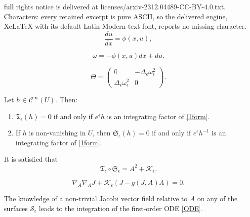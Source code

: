 \documentclass[10pt,a4paper]{amsart}
\begin{document}
full rights notice is delivered at licenses/arxiv-2312.04489-CC-BY-4.0.txt. Characters: every retained excerpt is pure ASCII, so the delivered engine, XeLaTeX with its default Latin Modern text font, reports no missing character.
\begin{equation}\label{ODE}  
    \frac{du}{dx}=\phi(x,u),  
\end{equation}  

\begin{equation}\label{1form}  
    \omega=-\phi(x,u)dx+du.
\end{equation}

\begin{equation}\label{LCdef}
\Theta=\begin{pmatrix}
    0 & -\Delta_{\epsilon} \omega_{\epsilon}^2\\ 
    \Delta_{\epsilon} \omega_{\epsilon}^2 & 0
\end{pmatrix}.    
\end{equation}

\begin{lemma}\label{prop:intsymop}
Let $h\in \mathcal{C}^{\infty}(U)$. Then:
\begin{enumerate}[label=(\alph*)]
    \item \label{it:integrating} $\mathfrak{T}_{\epsilon}(h)=0$ if and only if $e^{\epsilon} h$ is an integrating factor of \eqref{1form}.
    \item If $h$ is non-vanishing in $U$, then $\mathfrak{S}_{\epsilon}(h)=0$ if and only if $e^{\epsilon} h^{-1}$ is an integrating factor of \eqref{1form}.
\end{enumerate} 
\end{lemma}

\begin{lemma}\label{lem:op}
    It is satisfied that
    \begin{equation}
        \mathfrak{T}_{\epsilon}\circ \mathfrak{S}_{\epsilon}=A^2+\mathcal{K}_{\epsilon}.
    \end{equation}
\end{lemma}

\begin{equation}\label{JacobiDef}
    \nabla_{A} \nabla_{A}J+\mathcal{K}_{\epsilon}\left(J-g(J,A)A\right)=0.
\end{equation}

\begin{theorem}\label{th:Jacobi}
The knowledge of a non-trivial Jacobi vector field relative to $A$ on any of the surfaces $\mathcal{S}_{\epsilon}$ leads to the integration of the first-order ODE \eqref{ODE}.
\end{theorem}
\end{document}
